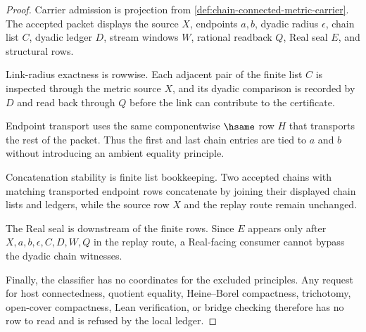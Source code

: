 \begin{proof}
Carrier admission is projection from \autoref{def:chain-connected-metric-carrier}. The accepted packet displays the source $X$, endpoints $a,b$, dyadic radius $\epsilon$, chain list $C$, dyadic ledger $D$, stream windows $W$, rational readback $Q$, Real seal $E$, and structural rows.

Link-radius exactness is rowwise. Each adjacent pair of the finite list $C$ is inspected through the metric source $X$, and its dyadic comparison is recorded by $D$ and read back through $Q$ before the link can contribute to the certificate.

Endpoint transport uses the same componentwise $\hsame$ row $H$ that transports the rest of the packet. Thus the first and last chain entries are tied to $a$ and $b$ without introducing an ambient equality principle.

Concatenation stability is finite list bookkeeping. Two accepted chains with matching transported endpoint rows concatenate by joining their displayed chain lists and ledgers, while the source row $X$ and the replay route remain unchanged.

The Real seal is downstream of the finite rows. Since $E$ appears only after $X,a,b,\epsilon,C,D,W,Q$ in the replay route, a Real-facing consumer cannot bypass the dyadic chain witnesses.

Finally, the classifier has no coordinates for the excluded principles. Any request for host connectedness, quotient equality, Heine--Borel compactness, trichotomy, open-cover compactness, Lean verification, or bridge checking therefore has no row to read and is refused by the local ledger.
\end{proof}

